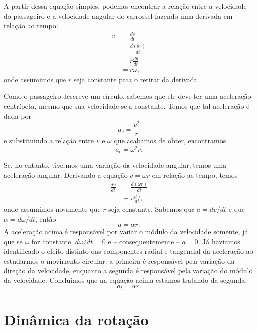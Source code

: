 A partir dessa equação simples, podemos encontrar a relação entre a velocidade do passageiro e a velocidade angular do carrossel fazendo uma derivada em relação ao tempo:
\begin{align}
	v &= \frac{ds}{dt} \\
	&= \frac{d(\theta r)}{dt} \\
	&= r\frac{d\theta}{dt} \\
	&= r\omega,
\end{align}
%
onde assumimos que $r$ seja constante para o retirar da derivada.

Como o passageiro descreve um círculo, sabemos que ele deve ter uma aceleração centrípeta, mesmo que sua velocidade seja constante. Temos que tal aceleração é dada por
\begin{equation}
	a_c = \frac{v^2}{r}
\end{equation}
%
e substituindo a relação entre $v$ e $\omega$ que acabamos de obter, encontramos
\begin{equation}
	a_c = \omega^2 r.
\end{equation}

Se, no entanto, tivermos uma variação da velocidade angular, temos uma aceleração angular. Derivando a equação $v = \omega r$ em relação ao tempo, temos
\begin{align}
	\frac{dv}{dt} &= \frac{d(\omega r)}{dt} \\
	&=r \frac{d\omega}{dt},
\end{align}
%
onde assumimos novamente que $r$ seja constante. Sabemos que $a=dv/dt$ e que $\alpha = d\omega/dt$, então
\begin{equation}
	a = \alpha r.
\end{equation}
%
A aceleração acima é responsável por variar o módulo da velocidade somente, já que se $\omega$ for constante, $d\omega/dt = 0$ e -- consequentemente -- $a=0$. Já haviamos identificado o efeito distinto das componentes radial e tangencial da aceleração ao estudarmos o movimento circular: a primeira é responsável pela variação da direção da velocidade, enquanto a segunda é responsável pela variação do módulo da velocidade. Concluímos que na equação acima estamos tratando da segunda:
\begin{equation}
	a_t = \alpha r.
\end{equation}

\section{Dinâmica da rotação}


